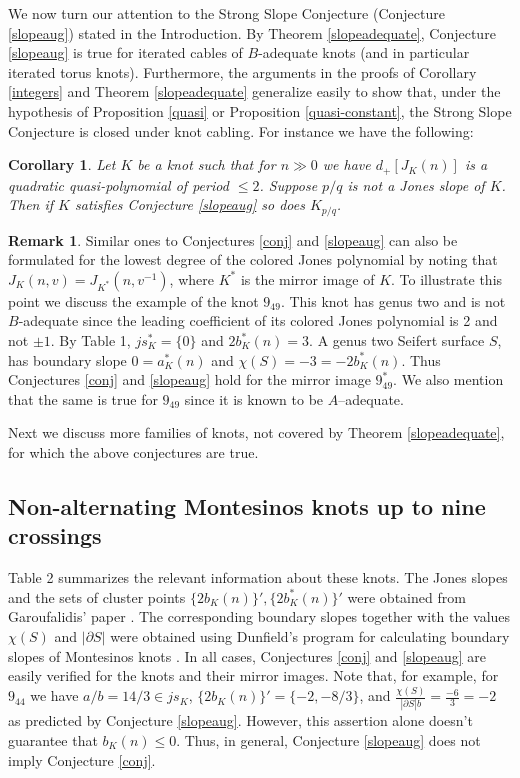\documentclass[11pt]{amsart}
\newtheorem{corollary}[theorem]{Corollary}
\theoremstyle{definition}
\newtheorem{remark}[theorem]{Remark}
\newcommand{\abs}[1]{{\left\vert #1 \right\vert}}
\begin{document}
We now turn our attention to the Strong Slope Conjecture (Conjecture \ref{slopeaug})  stated in the Introduction.
By Theorem \ref{slopeadequate}, Conjecture \ref{slopeaug} is true for iterated cables of $B$-adequate knots (and in particular iterated torus knots).
Furthermore,  the arguments in the proofs of Corollary \ref{integers} and  Theorem \ref{slopeadequate} generalize easily to show that, under the hypothesis of Proposition \ref{quasi} or Proposition \ref{quasi-constant}, the Strong Slope Conjecture is closed under knot cabling. For instance we have the following:

\begin{corollary}
Let $K$ be a knot such that for $n \gg 0$ we have
$d_+[J_K(n)]$
is a quadratic quasi-polynomial of period $\le 2$. Suppose $p/q$ is not a Jones slope of $K$. Then if $K$ satisfies Conjecture \ref{slopeaug} so does $K_{p/q}$.
\end{corollary}


\begin{remark}Similar ones to Conjectures \ref{conj} and \ref{slopeaug}  can also be formulated  for the lowest degree of the colored Jones polynomial by noting that $J_K(n, v) = J_{K^*}(n, v^{-1})$, where $K^*$ is the mirror image of $K$. To illustrate this
point  we discuss the example of the knot $9_{49}$. This knot has genus two and is not $B$-adequate since the leading coefficient of its colored Jones polynomial 
is 2 \cite{Ga-slope}
and not $\pm 1$.  By Table 1, $ js^*_K=\{0\} $ and $2b_K^*(n)=3$.
A genus two Seifert surface $S$,  has boundary  slope $0=a_K^*(n)$ and $\chi(S)=-3=-2b_K^*(n)$. Thus   
Conjectures  \ref{conj} and \ref{slopeaug} 
hold for
the mirror image $9^{*}_{49}$. We also mention that  the same is true for $9_{49}$ since it is known to be $A$--adequate.
\end{remark}

 Next we 
discuss more families of knots, not covered by Theorem  \ref{slopeadequate},
for which the above conjectures are true.


\subsection{Non-alternating Montesinos knots up to nine crossings} Table 2 summarizes the relevant information 
about these knots.
The Jones slopes and  the sets of cluster points 
$\{2b_K(n)\}', \{2b_K^{*}(n)\}'$ were obtained from Garoufalidis' paper \cite{Ga-slope}.
The corresponding
boundary slopes together with the values $\chi(S)$ and $\abs{\partial S}$ were obtained using Dunfield's program for calculating boundary slopes of Montesinos knots \cite{ndunfield}.
In all cases,  Conjectures \ref{conj} and \ref{slopeaug} are easily verified for the knots and their mirror images.
Note that, for example, for $9_{44}$
we have $a/b=14/3 \in js_K$, $\{2b_K(n)\}'=\{-2, -8/3\}$, and $\frac{\chi(S)}{{\abs{\partial S} b}} =\frac{-6}{3}=-2$ as predicted
by  Conjecture \ref{slopeaug}. However, this assertion alone  doesn't guarantee that $b_K(n)\le 0$. Thus,
in general,   Conjecture \ref{slopeaug} does not imply Conjecture \ref{conj}.
\end{document}
